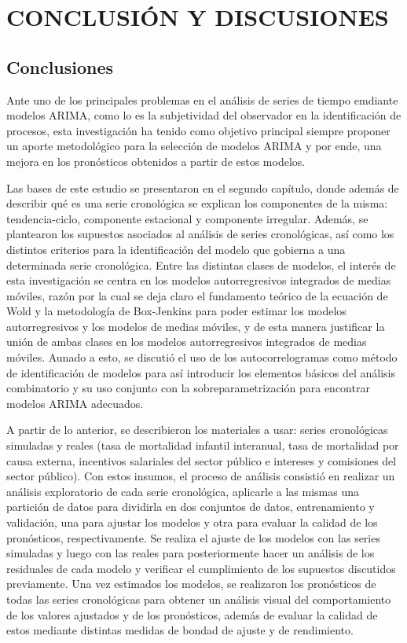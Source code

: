 \documentclass[
]{article}
\begin{document}
\newpage
\newpage

\section{CONCLUSIÓN Y DISCUSIONES}

\subsection{Conclusiones}

Ante uno de los principales problemas en el análisis de series de tiempo
emdiante modelos ARIMA, como lo es la subjetividad del observador en la
identificación de procesos, esta investigación ha tenido como objetivo
principal siempre proponer un aporte metodológico para la selección de
modelos ARIMA y por ende, una mejora en los pronósticos obtenidos a
partir de estos modelos.

Las bases de este estudio se presentaron en el segundo capítulo, donde
además de describir qué es una serie cronológica se explican los
componentes de la misma: tendencia-ciclo, componente estacional y
componente irregular. Además, se plantearon los supuestos asociados al
análisis de series cronológicas, así como los distintos criterios para
la identificación del modelo que gobierna a una determinada serie
cronológica. Entre las distintas clases de modelos, el interés de esta
investigación se centra en los modelos autorregresivos integrados de
medias móviles, razón por la cual se deja claro el fundamento teórico de
la ecuación de Wold y la metodología de Box-Jenkins para poder estimar
los modelos autorregresivos y los modelos de medias móviles, y de esta
manera justificar la unión de ambas clases en los modelos
autorregresivos integrados de medias móviles. Aunado a esto, se discutió
el uso de los autocorrelogramas como método de identificación de modelos
para así introducir los elementos básicos del análisis combinatorio y su
uso conjunto con la sobreparametrización para encontrar modelos ARIMA
adecuados.

A partir de lo anterior, se describieron los materiales a usar: series
cronológicas simuladas y reales (tasa de mortalidad infantil interanual,
tasa de mortalidad por causa externa, incentivos salariales del sector
público e intereses y comisiones del sector público). Con estos insumos,
el proceso de análisis consistió en realizar un análisis exploratorio de
cada serie cronológica, aplicarle a las mismas una partición de datos
para dividirla en dos conjuntos de datos, entrenamiento y validación,
una para ajustar los modelos y otra para evaluar la calidad de los
pronósticos, respectivamente. Se realiza el ajuste de los modelos con
las series simuladas y luego con las reales para posteriormente hacer un
análisis de los residuales de cada modelo y verificar el cumplimiento de
los supuestos discutidos previamente. Una vez estimados los modelos, se
realizaron los pronósticos de todas las series cronológicas para obtener
un análisis visual del comportamiento de los valores ajustados y de los
pronósticos, además de evaluar la calidad de estos mediante distintas
medidas de bondad de ajuste y de rendimiento.
\end{document}
